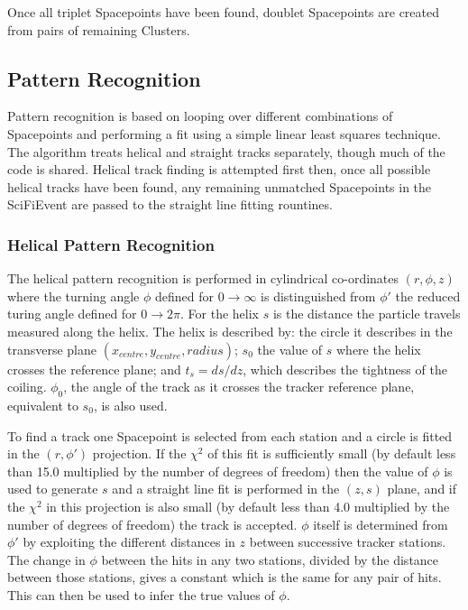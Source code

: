   Once all triplet Spacepoints have been found, doublet Spacepoints are created from pairs of remaining Clusters. 


  \subsection{Pattern Recognition}
  \label{subsec:PatternRecognition}

  Pattern recognition is based on looping over different combinations of Spacepoints and performing a fit using a simple linear least squares technique.  The algorithm treats helical and straight tracks separately, though much of the code is shared. Helical track finding is attempted first then, once all possible helical tracks have been found, any remaining unmatched Spacepoints in the SciFiEvent are passed to the straight line fitting rountines.

   \subsubsection{Helical Pattern Recognition}
   \label{subsubsec:HelicalPatternRecognition}

   The helical pattern recognition is performed in cylindrical co-ordinates $(r, \phi, z)$ where the turning angle $\phi$ defined for $0 \rightarrow \infty$ is distinguished from $\phi '$ the reduced turing angle defined  for $0 \rightarrow 2\pi$. For the helix $s$ is the distance the particle travels measured along the helix. The helix is described by: the circle it describes in the transverse plane $(x_{centre}, y_{centre}, radius)$; $s_0$ the value of $s$ where the helix crosses the reference plane; and $t_s = ds/dz$, which describes the tightness of the coiling. $\phi_0$, the angle of the track as it crosses the tracker reference plane, equivalent to $s_0$, is also used. 

   To find a track one Spacepoint is selected from each station and a circle is fitted in the $(r, \phi')$ projection. If the $\chi^2$ of this fit is sufficiently small (by default less than 15.0 multiplied by the number of degrees of freedom) then the value of $\phi$ is used to generate $s$ and a straight line fit is performed in the $(z,s)$ plane, and if the $\chi^2$ in this projection is also small (by default less than 4.0 multiplied by the number of degrees of freedom) the track is accepted.  $\phi$ itself is determined from $\phi'$ by exploiting the different distances in $z$ between successive tracker stations.  The change in $\phi$ between the hits in any two stations, divided by the distance between those stations, gives a constant which is the same for any pair of hits.  This can then be used to infer the true values of $\phi$.

